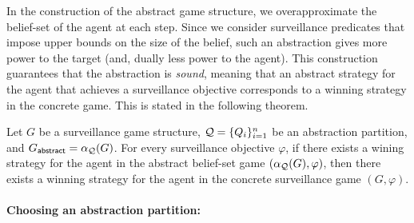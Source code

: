 In the construction of the abstract  game structure, we overapproximate the belief-set of the agent at each step. Since we consider surveillance predicates that impose upper bounds on the size of the belief, such an abstraction  gives more power to the target (and, dually less power to the agent).  This construction guarantees that the abstraction is \emph{sound}, meaning that an abstract strategy for the agent that achieves a surveillance objective corresponds to a winning strategy in the concrete game. This is stated in the following theorem.

\begin{theorem}
Let $G$ be a surveillance game structure, $\mathcal{Q} = \{Q_i\}_{i=1}^n$ be an abstraction partition, and $G_{\mathsf{abstract}} = \alpha_{\mathcal{Q}}(G)$. For every surveillance objective $\varphi$, if there exists a wining strategy for the agent in the abstract belief-set game $(\alpha_{\mathcal{Q}}(G),\varphi)$, then there exists a winning strategy for the agent in the concrete surveillance game $(G,\varphi)$.
\end{theorem}

\paragraph{Choosing an abstraction partition:}